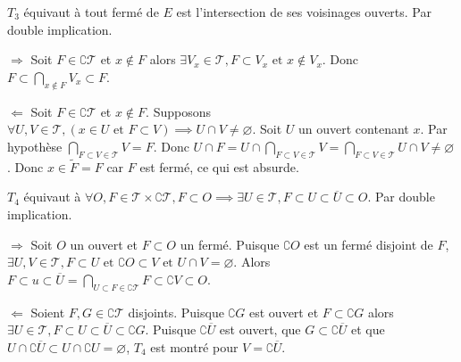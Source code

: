 \documentclass[a4paper, 11pt, french]{book}
\newenvironment{itemise}{\itemize}{\enditemize}
\theoremstyle{plain} %
\theoremstyle{definition} %
\theoremstyle{remark} %
\newcommand{\1}{\mathds{1}}
\newcommand\vide{\varnothing}
\newcommand\et{\text{ et }}
\begin{document}
\proposition
$T_3$ équivaut à tout fermé de $E$ est l'intersection de ses voisinages ouverts.
\demonstration
Par double implication.
\begin{itemise}
	\item[$\Rightarrow$] Soit $F\in\complement\mathscr{T}$ et $x\notin F$ alors $\exists V_x\in\mathscr{T}, F\subset V_x\et x\notin V_x$.
	Donc $F\subset\bigcap_{x\notin F}V_x\subset F$.
	\item[$\Leftarrow$] Soit $F\in\complement\mathscr{T}$ et $x\notin F$.
	Supposons $\forall U, V\in\mathscr{T}, (x\in U\et F\subset V)\implies U\cap V\neq\vide$.
	Soit $U$ un ouvert contenant $x$.
	Par hypothèse $\bigcap_{F\subset V\in\mathscr{T}}V=F$.
	Donc $U\cap F=U\cap\bigcap_{F\subset V\in\mathscr{T}}V=\bigcap_{F\subset V\in\mathscr{T}}U\cap V\neq\vide$.
	Donc $x\in\widetilde{F}=F$ car $F$ est fermé, ce qui est absurde.
\end{itemise}

\proposition
$T_4$ équivaut à $\forall O, F\in\mathscr{T}\times\complement\mathscr{T}, F\subset O\implies\exists U\in\mathscr{T}, F\subset U\subset\overline{U}\subset O$.
\demonstration
Par double implication.
\begin{itemise}
	\item[$\Rightarrow$] Soit $O$ un ouvert et $F\subset O$ un fermé.
	Puisque $\complement O$ est un fermé disjoint de $F$, $\exists U, V\in\mathscr{T}, F\subset U\et\complement O\subset V\et U\cap V=\vide$.
	Alors $F\subset u\subset\overline{U}=\bigcap_{U\subset F\in\complement\mathscr{T}}F\subset\complement V\subset O$.
	\item[$\Leftarrow$] Soient $F, G\in\complement\mathscr{T}$ disjoints.
	Puisque $\complement G$ est ouvert et $F\subset\complement G$ alors $\exists U\in\mathscr{T}, F\subset U\subset\overline{U}\subset\complement G$.
	Puisque $\complement\overline{U}$ est ouvert, que $G\subset\complement\overline{U}$ et que $U\cap\complement\overline{U}\subset U\cap\complement U=\vide$, $T_4$ est montré pour $V=\complement\overline{U}$.
\end{itemise}
\end{document}

